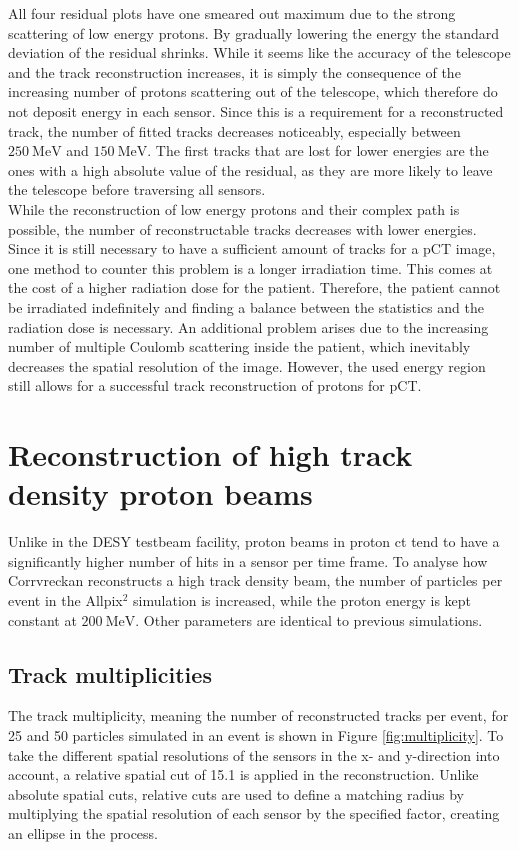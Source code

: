 All four residual plots have one smeared out maximum due to the strong scattering of low energy protons. By gradually lowering the energy the standard deviation of the residual shrinks. While
it seems like the accuracy of the telescope and the track reconstruction increases, it is simply the consequence of the increasing number of protons scattering
out of the telescope, which therefore do not deposit energy in each sensor. Since this is a requirement for a reconstructed track, the number of fitted tracks decreases
noticeably, especially between $\SI{250}{\mega\eV}$ and $\SI{150}{\mega\eV}$. The first tracks that are lost for lower energies
are the ones with a high absolute value of the residual, as they are more likely to leave the telescope before traversing all sensors. \\
While the reconstruction of low energy protons and their complex path is possible, the number of reconstructable tracks decreases with lower energies.
Since it is still necessary to have a sufficient amount of tracks for a pCT image, one method to counter this problem is a longer irradiation time.
This comes at the cost of a higher radiation dose for the patient. Therefore, the patient cannot be irradiated indefinitely and finding a balance between the statistics and the
radiation dose is necessary.
An additional problem arises due to the increasing number of multiple Coulomb scattering inside the patient, which inevitably decreases the spatial resolution of the image.
However, the used energy region still allows for a successful track reconstruction of protons for pCT.


\chapter{Reconstruction of high track density proton beams}\label{sec:density}
Unlike in the DESY testbeam facility, proton beams in proton ct tend to have a significantly higher number of hits in a sensor
per time frame. To analyse how Corrvreckan reconstructs a high track density beam, the number of particles per event in the Allpix$^2$
simulation is increased, while the proton energy is kept constant at $\SI{200}{\mega\eV}$. Other parameters are identical to previous simulations.

\section{Track multiplicities} \label{sec:multiplicites}
The track multiplicity, meaning the number of reconstructed tracks per event, for 25 and 50 particles simulated in an event is shown in Figure \ref{fig:multiplicity}. To take the different spatial resolutions of the sensors in the x- and y-direction into account, a relative
spatial cut of 15.1 is applied in the reconstruction. Unlike absolute spatial cuts, relative cuts are used to define a
matching radius by multiplying the spatial resolution
of each sensor by the specified factor, creating an ellipse in the process.

